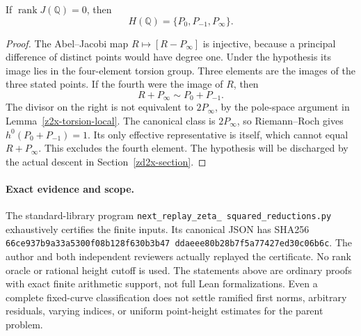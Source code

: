 \begin{lemma}
\label{z2x-rank-zero-points}
If \(\operatorname{rank}J(\mathbb Q)=0\), then
\[
 H(\mathbb Q)=\{P_0,P_{-1},P_\infty\}.
\]
\end{lemma}
\begin{proof}
The Abel--Jacobi map \(R\mapsto[R-P_\infty]\) is injective,
because a principal difference of distinct points would have
degree one. Under the hypothesis its image lies in the
four-element torsion group. Three elements are the images of
the three stated points. If the fourth were the image of \(R\),
then
\[
 R+P_\infty\sim P_0+P_{-1}.
\]
The divisor on the right is not equivalent to \(2P_\infty\),
by the pole-space argument in Lemma~\ref{z2x-torsion-local}.
The canonical class is \(2P_\infty\), so Riemann--Roch gives
\(h^0(P_0+P_{-1})=1\). Its only effective representative is
itself, which cannot equal \(R+P_\infty\). This excludes the
fourth element. The hypothesis will be discharged by the
actual descent in Section~\ref{zd2x-section}.
\end{proof}

\paragraph{Exact evidence and scope.}
The standard-library program
\texttt{next\_\allowbreak replay\_\allowbreak zeta\_\allowbreak
squared\_\allowbreak reductions.py} exhaustively certifies the
finite inputs. Its canonical JSON has SHA256
\texttt{66ce937b9a33a530\allowbreak0f08b128f630b3b47\allowbreak
ddaeee80b28b7f5a7\allowbreak7427ed30c06b6c}.
The author and both independent reviewers actually replayed
the certificate. No rank oracle or rational height cutoff is
used. The statements above are ordinary proofs with exact
finite arithmetic support, not full Lean formalizations.
Even a complete fixed-curve classification does not settle
ramified first norms, arbitrary residuals, varying indices,
or uniform point-height estimates for the parent problem.
